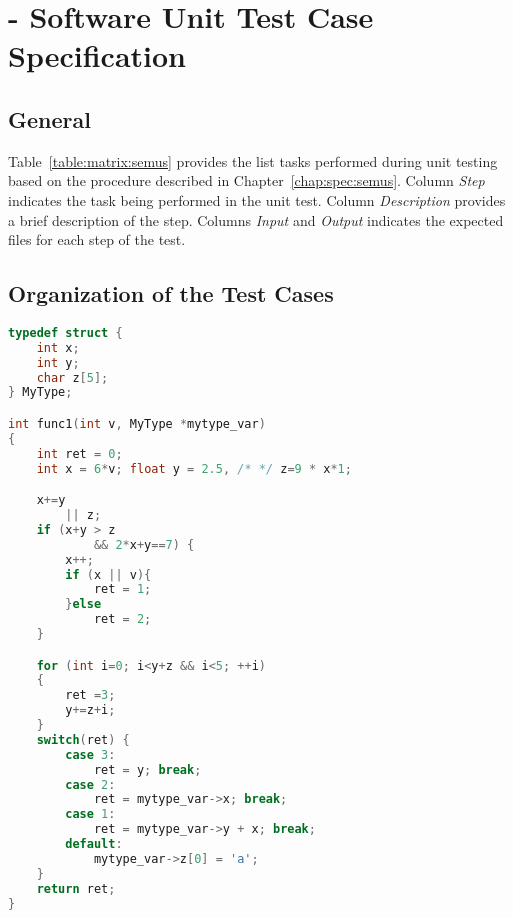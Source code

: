 
\chapter{\SEMUS - Software Unit Test Case Specification}
\label{chap:specs:semus}

\section{General}




Table~\ref{table:matrix:semus} provides the list tasks performed during unit testing based on the procedure described in Chapter~\ref{chap:spec:semus}.
Column \emph{Step} indicates the task being performed in the unit test. Column \emph{Description} provides a brief description of the step. Columns \emph{Input} and \emph{Output} indicates the expected files for each step of the test. 



\clearpage

\section{Organization of the Test Cases}

\begin{lstlisting}[language=C, label=test_source_semus, caption=C function example.]
typedef struct {
    int x;
    int y;
    char z[5];
} MyType;

int func1(int v, MyType *mytype_var)
{
    int ret = 0;
    int x = 6*v; float y = 2.5, /* */ z=9 * x*1;

    x+=y
        || z;
    if (x+y > z
            && 2*x+y==7) {
        x++;
        if (x || v){
            ret = 1;
        }else
            ret = 2;
    }

    for (int i=0; i<y+z && i<5; ++i) 
    {
        ret =3;
        y+=z+i;
    }
    switch(ret) {
        case 3:
            ret = y; break;
        case 2:
            ret = mytype_var->x; break;
        case 1: 
            ret = mytype_var->y + x; break;
        default:
            mytype_var->z[0] = 'a';
    }
    return ret;
}
\end{lstlisting}

